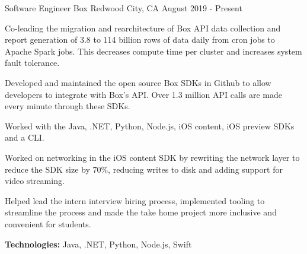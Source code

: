
\begin{cventries}
  \cventry
    {Software Engineer} %
    {Box} %
    {Redwood City, CA} %
    {August 2019 - Present} %
    {
      \begin{cvitems} %
        \item{Co-leading the migration and rearchitecture of Box API data collection and report generation of 3.8 to 114 billion rows of data daily from cron jobs to Apache Spark jobs. This decreases compute time per cluster and increases system fault tolerance.}
        \item{Developed and maintained the open source Box SDKs in Github to allow developers to integrate with Box's API. Over 1.3 million API calls are made every minute through these SDKs.}
        \item{Worked with the Java, .NET, Python, Node.js, iOS content, iOS preview SDKs and a CLI.}
        \item{Worked on networking in the iOS content SDK by rewriting the network layer to reduce the SDK size by 70\%, reducing writes to disk and adding support for video streaming.}
        \item{Helped lead the intern interview hiring process, implemented tooling to streamline the process and made the take home project more inclusive and convenient for students.}
        {\setlength \itemindent{-2ex} \itemsep2pt \item[] \textbf{Technologies:} Java, .NET, Python, Node.js, Swift}
        {\setlength \itemindent{-2ex} \itemsep2pt \item[] 
        \href{https://sujaygarlanka.com/experience.html\#box}{ \faInfoCircle \textbf{\color{awesome}{ Details}}}
        \href{https://github.com/box/sdks}{ \faGithub \textbf{\color{awesome}{ Code}}}}
      \end{cvitems}
    }
    

\end{cventries}
